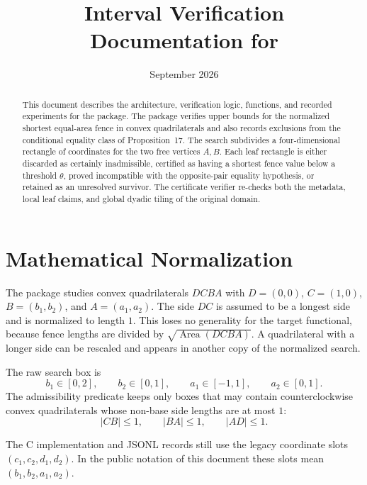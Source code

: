 \documentclass[11pt]{article}
\title{Interval Verification Documentation for \code{TrapeziumFence}}
\author{}
\date{September 2026}
\DeclareRobustCommand{\code}[1]{\texttt{\detokenize{#1}}}
\newcommand{\Area}{\operatorname{Area}}
\begin{document}
\maketitle

\begin{abstract}
This document describes the architecture, verification logic, functions, and
recorded experiments for the \code{TrapeziumFence} package.  The package verifies
upper bounds for the normalized shortest equal-area fence in convex
quadrilaterals and also records exclusions from the conditional equality class
of Proposition~17.
The search subdivides a four-dimensional rectangle of coordinates for the two
free vertices \(A,B\).  Each leaf rectangle is either discarded as certainly
inadmissible, certified as having a shortest fence value below a threshold
\(\theta\), proved incompatible with the opposite-pair equality hypothesis, or
retained as an unresolved survivor.  The certificate verifier re-checks both
the metadata, local leaf claims, and global dyadic tiling of the original
domain.
\end{abstract}

\tableofcontents

\section{Mathematical Normalization}

The package studies convex quadrilaterals \(DCBA\) with \(D=(0,0)\),
\(C=(1,0)\), \(B=(b_1,b_2)\), and \(A=(a_1,a_2)\).  The side \(DC\) is assumed
to be a longest side and is normalized to length \(1\).  This loses no
generality for the target functional, because fence lengths are divided by
\(\sqrt{\Area(DCBA)}\).  A quadrilateral with a longer side can be rescaled and
appears in another copy of the normalized search.

The raw search box is
\[
  b_1\in[0,2],\qquad b_2\in[0,1],\qquad
  a_1\in[-1,1],\qquad a_2\in[0,1].
\]
The admissibility predicate keeps only boxes that may contain counterclockwise
convex quadrilaterals whose non-base side lengths are at most \(1\):
\[
  |CB|\le 1,\qquad |BA|\le 1,\qquad |AD|\le 1.
\]

The C implementation and JSONL records still use the legacy coordinate slots
\((c_1,c_2,d_1,d_2)\).  In the public notation of this document these slots
mean \((b_1,b_2,a_1,a_2)\).
\end{document}
